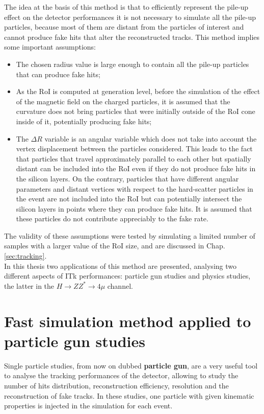 \documentclass[a4paper,twoside,12pt]{book}
\begin{document}
The idea at the basis of this method is that to efficiently represent the pile-up effect on the
detector performances it is not necessary to simulate all the pile-up particles, because most 
of them are distant from the particles of interest and cannot produce fake hits that 
alter the reconstructed tracks. This 
method implies some important assumptions:
\begin{itemize}
\item The chosen radius value is large enough to contain all the pile-up particles that can produce
fake hits;
\item As the RoI is computed at generation level, before the simulation of the effect of the
magnetic field on the charged particles, it is assumed that the curvature does not bring
particles that were initially outside of the RoI cone inside of it, potentially producing fake hits;
\item The $\Delta R$ variable is an angular variable which does not take into account the vertex displacement between the particles considered. This leads to the fact that particles 
that travel approximately parallel to each other but spatially distant can be included into the
RoI even if they do not produce fake hits in the silicon layers. On the contrary, particles that 
have different angular parameters and distant vertices with respect to the hard-scatter
particles in the event are not included into the RoI but can potentially intersect the silicon 
layers in points where they can produce fake hits. It is assumed that these particles do 
not contribute appreciably to the fake rate.
\end{itemize}

The validity of these assumptions were tested by simulating a limited number of samples with
a larger value of the RoI size, and are discussed in Chap.\ref{sec:tracking}.\\

In this thesis two applications of this method are presented, analysing two different aspects
of ITk performances: particle gun studies and physics studies, the latter
in the $H \rightarrow ZZ^{*} \rightarrow 4\mu$ channel. \\


\section{Fast simulation method applied to particle gun studies}\label{sec:simulation:pg}

Single particle studies, from now on dubbed \textbf{particle gun}, are a very useful tool to analyse the tracking performances of the
detector, allowing to study the number of hits distribution, reconstruction efficiency, resolution and the reconstruction of fake tracks. In these studies, one particle with given kinematic properties is injected in the simulation for each event.\\
\end{document}
